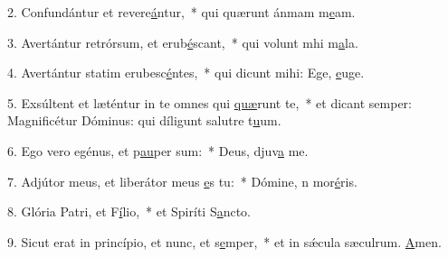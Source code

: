 2. Confundántur et revere\uline{á}ntur,~* qui quærunt ánmam m\uline{e}am.\par 
3. Avertántur retrórsum, et erub\uline{é}scant,~* qui volunt mhi m\uline{a}la.\par 
4. Avertántur statim erubesc\uline{é}ntes,~* qui dicunt mihi: Ege, \uline{e}uge.\par 
5. Exsúltent et læténtur in te omnes qui \uline{quæ}runt te,~* et dicant semper: Magnificétur Dóminus: qui díligunt salutre t\uline{u}um.\par 
6. Ego vero egénus, et p\uline{au}per sum:~* Deus, djuv\uline{a} me.\par 
7. Adjútor meus, et liberátor meus \uline{e}s tu:~* Dómine, n mor\uline{é}ris.\par 
8. Glória Patri, et F\uline{í}lio,~* et Spiríti S\uline{a}ncto.\par 
9. Sicut erat in princípio, et nunc, et s\uline{e}mper,~* et in sǽcula sæculrum. \uline{A}men.\par 
